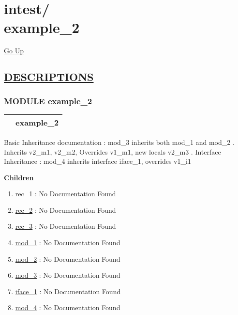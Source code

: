 \chapter*{\color{headfile}
{\large intest\slash\hspace{0pt}}
 \\
example_2
}
\hypertarget{ecldoc:toc:intest.example_2}{}
\hyperlink{ecldoc:toc:root/intest}{Go Up}


\section*{\underline{\textsf{DESCRIPTIONS}}}
\subsection*{\textsf{\colorbox{headtoc}{\color{white} MODULE}
example\_2}}

\hypertarget{ecldoc:intest.example_2}{}

{\renewcommand{\arraystretch}{1.5}
\begin{tabularx}{\textwidth}{|>{\raggedright\arraybackslash}l|X|}
\hline
\hspace{0pt}\mytexttt{\color{red} } & \textbf{example\_2} \\
\hline
\end{tabularx}
}

\par





Basic Inheritance documentation : mod\_3 inherits both mod\_1 and mod\_2 . Inherits v2\_m1, v2\_m2, Overrides v1\_m1, new locals v2\_m3 . Interface Inheritance : mod\_4 inherits interface iface\_1, overrides v1\_i1







\textbf{Children}
\begin{enumerate}
\item \hyperlink{ecldoc:intest.example_2.rec_1}{rec\_1}
: No Documentation Found
\item \hyperlink{ecldoc:intest.example_2.rec_2}{rec\_2}
: No Documentation Found
\item \hyperlink{ecldoc:intest.example_2.rec_3}{rec\_3}
: No Documentation Found
\item \hyperlink{ecldoc:intest.example_2.mod_1}{mod\_1}
: No Documentation Found
\item \hyperlink{ecldoc:intest.example_2.mod_2}{mod\_2}
: No Documentation Found
\item \hyperlink{ecldoc:intest.example_2.mod_3}{mod\_3}
: No Documentation Found
\item \hyperlink{ecldoc:intest.example_2.iface_1}{iface\_1}
: No Documentation Found
\item \hyperlink{ecldoc:intest.example_2.mod_4}{mod\_4}
: No Documentation Found
\end{enumerate}

